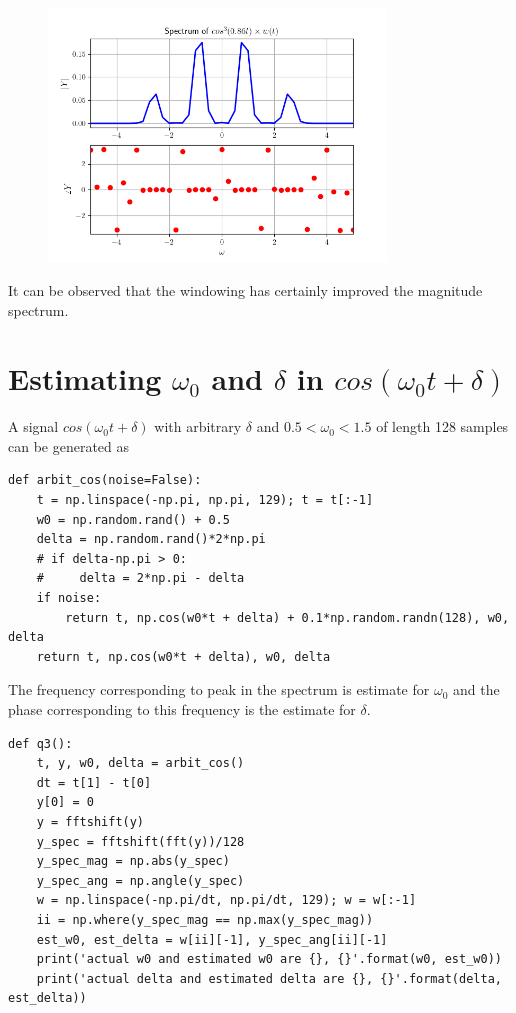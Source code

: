 \documentclass[12pt, a4paper]{article}
\begin{document}
\begin{figure}[H]
\centering
\includegraphics[width=0.8\textwidth]{q2_2.png}
\end{figure}

It can be observed that the windowing has certainly improved the magnitude spectrum.

\section{Estimating $\omega_0$ and $\delta$ in $cos(\omega_0 t + \delta)$}

A signal $cos(\omega_0 t + \delta)$ with arbitrary $\delta$ and $0.5 < \omega_0 < 1.5$ of length 128 samples can be generated as

\begin{lstlisting}
def arbit_cos(noise=False):
    t = np.linspace(-np.pi, np.pi, 129); t = t[:-1]
    w0 = np.random.rand() + 0.5
    delta = np.random.rand()*2*np.pi
    # if delta-np.pi > 0:
    #     delta = 2*np.pi - delta
    if noise:
        return t, np.cos(w0*t + delta) + 0.1*np.random.randn(128), w0, delta
    return t, np.cos(w0*t + delta), w0, delta
\end{lstlisting}

The frequency corresponding to peak in the spectrum is estimate for $\omega_0$ and the phase corresponding to this frequency is the estimate for $\delta$.

\begin{lstlisting}
def q3():
    t, y, w0, delta = arbit_cos()
    dt = t[1] - t[0]
    y[0] = 0
    y = fftshift(y)
    y_spec = fftshift(fft(y))/128
    y_spec_mag = np.abs(y_spec)
    y_spec_ang = np.angle(y_spec)
    w = np.linspace(-np.pi/dt, np.pi/dt, 129); w = w[:-1]
    ii = np.where(y_spec_mag == np.max(y_spec_mag))
    est_w0, est_delta = w[ii][-1], y_spec_ang[ii][-1]
    print('actual w0 and estimated w0 are {}, {}'.format(w0, est_w0))
    print('actual delta and estimated delta are {}, {}'.format(delta, est_delta))
\end{lstlisting}
\end{document}
